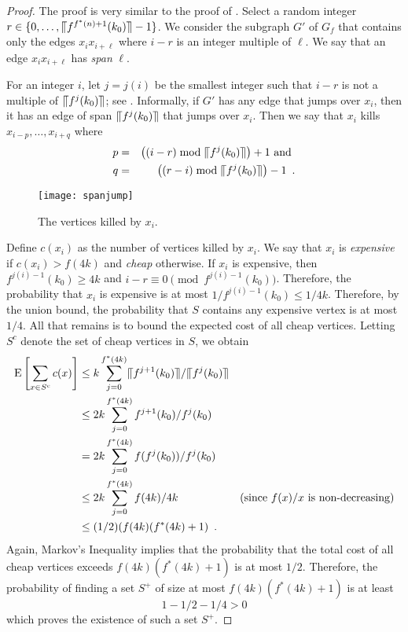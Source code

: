 \documentclass{patmorin}
\begin{document}
\begin{proof}
  The proof is very similar to the proof of .  Select a random
  integer $r\in\{0,\ldots,\llceil f^{f^*(n)+1}(k_0)\rrceil-1\}$.  We consider the
  subgraph $G'$ of $G_f$ that contains only the edges $x_ix_{i+\ell}$
  where $i-r$ is an integer multiple of $\ell$.  We say that an edge
  $x_ix_{i+\ell}$ has \emph{span} $\ell$.

  For an integer $i$, let $j=j(i)$ be the smallest integer such that
  $i-r$ is not a multiple of $\llceil f^j(k_0)\rrceil$; see .
  Informally, if $G'$ has any edge that jumps over $x_i$, then it has an
  edge of span $\llceil f^j(k_0)\rrceil$ that jumps over $x_i$.  Then we say that
   $x_i$ kills $x_{i-p},\ldots,x_{i+q}$ where
  \begin{eqnarray*}
     p&=& \left((i-r) \bmod \llceil f^j(k_0)\rrceil\right)+1 \text{ and } \\
     q&=& \left((r-i) \bmod \llceil f^j(k_0)\rrceil\right)-1 \enspace .
  \end{eqnarray*}
  \begin{figure}
    \begin{center}
      \texttt{[image: spanjump]}
    \end{center}
    \caption{The vertices killed by $x_i$.}
  \end{figure}
  
  Define $c(x_i)$ as the number of vertices killed by $x_i$.  We say
  that $x_i$ is \emph{expensive} if $c(x_i) > f(4k)$ and \emph{cheap}
  otherwise.  If $x_i$ is expensive, then $f^{j(i)-1}(k_0)\ge 4k$ and
  $i-r\equiv 0 \pmod {f^{j(i)-1}(k_0)}$.  Therefore, the probability
  that $x_i$ is expensive is at most $1/f^{j(i)-1}(k_0) \le 1/4k$.
  Therefore, by the union bound, the probability that $S$ contains any
  expensive vertex is at most $1/4$.  All that remains is to bound the
  expected cost of all cheap vertices. Letting $S^c$ denote the set of
  cheap vertices in $S$, we obtain
  \begin{align*}
     \mathrm{E}\left[\sum_{x\in S^c} c(x)\right] 
      & \le  k \sum_{j=0}^{f^*(4k)} \llceil f^{j+1}(k_0)\rrceil/\llceil f^j(k_0)\rrceil \\
      & \le  2k \sum_{j=0}^{f^*(4k)} f^{j+1}(k_0)/f^j(k_0) \\
      & =  2k \sum_{j=0}^{f^*(4k)} f(f^{j}(k_0))/f^j(k_0) \\
      & \le  2k \sum_{j=0}^{f^*(4k)} f(4k)/4k 
           & \text{(since $f(x)/x$ is non-decreasing)} \\
      & \le  (1/2)(f(4k)(f^*(4k)+1) \enspace .
  \end{align*}
  Again, Markov's Inequality implies that the probability that the total
  cost of all cheap vertices exceeds $f(4k)(f^*(4k)+1)$ is at most $1/2$.
  Therefore, the probability of finding a set $S^+$ of size at most
  $f(4k)(f^*(4k)+1)$ is at least
  \[  
     1 - 1/2 - 1/4 > 0 
  \]
  which proves the existence of such a set $S^+$.
  

\end{proof}
\end{document}
